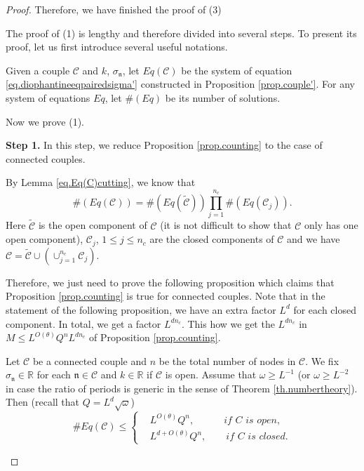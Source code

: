 \begin{proof}
    Therefore, we have finished the proof of (3)
    
    The proof of (1) is lengthy and therefore divided into several steps. To present its proof, let us first introduce several useful notations.
    
    Given a couple $\mathcal{C}$ and $k$, $\sigma_{\mathfrak{n}}$, let $Eq(\mathcal{C})$ be the system of equation \eqref{eq.diophantineeqpairedsigma'} constructed in Proposition \ref{prop.couple'}. For any system of equations $Eq$, let $\#(Eq)$ be its number of solutions.
    
    Now we prove (1).
    
    \textbf{Step 1.} In this step, we reduce Proposition \ref{prop.counting} to the case of connected couples.
    
    By Lemma \eqref{eq.Eq(C)cutting}, we know that 
    \begin{equation}\label{eq.conn}
     \#(Eq(\mathcal{C}))= \#(Eq(\widetilde{\mathcal{C}}))\prod_{j=1}^{n_c} \#(Eq(\mathcal{C}_{j})).
    \end{equation}
    Here $\widetilde{\mathcal{C}}$ is the open component of $\mathcal{C}$ (it is not difficult to show that $\mathcal{C}$ only has one open component), $\mathcal{C}_{j}$, $1\le j\le n_c$ are the closed components of $\mathcal{C}$ and we have $\mathcal{C}=\widetilde{\mathcal{C}}\cup(\cup_{j=1}^{n_c} \mathcal{C}_{j})$.
    
    Therefore, we just need to prove the following proposition which claims that Proposition \ref{prop.counting} is true for connected couples. Note that in the statement of the following proposition, we have an extra factor $L^d$ for each closed component. In total, we get a factor $L^{dn_c}$. This how we get the $L^{dn_c}$ in $M\leq L^{O(\theta)} Q^{n} L^{dn_c}$ of Proposition \ref{prop.counting}.
    
    
    \begin{prop}\label{prop.countingconn} Let $\mathcal{C}$ be a connected couple and $n$ be the total number of nodes in $\mathcal{C}$. We fix $\sigma_{\mathfrak{n}}\in\mathbb{R}$ for each $\mathfrak{n}\in \mathcal{C}$ and $k\in \mathbb{R}$ if $\mathcal{C}$ is open. Assume that $\omega\ge L^{-1}$ (or $\omega\ge L^{-2}$ in case the ratio of periods is generic in the sense of Theorem \ref{th.numbertheory}). Then (recall that $Q=L^{d}\sqrt{\omega}$)
    \begin{equation}\label{eq.countingbd2}\# Eq(\mathcal{C})\leq\left\{\begin{aligned}
    &L^{O(\theta)} Q^{n}, \qquad\quad\textit{if $C$ is open},\\
    & L^{d+O(\theta) }Q^{n},\qquad\textit{if $C$ is closed}.
    \end{aligned}
    \right.
    \end{equation}
    \end{prop}
    

\end{proof}
